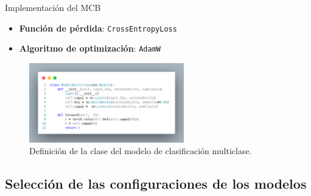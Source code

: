 \begin{frame}{Implementación del MCB}
	\begin{itemize}
		\item \textbf{Función de pérdida}: \texttt{CrossEntropyLoss}
		\item \textbf{Algoritmo de optimización}: \texttt{AdamW}
	\end{itemize}
	
	\begin{figure}[H]
	    \centering
	    \includegraphics[width=0.6\textwidth]{../Memoria/img/modelo/codigo/modeloMUL.png}
	    	\caption{Definición de la clase del modelo de clasificación multiclase.}
    		\label{fig:modBIN}
	\end{figure}
	
	\begin{table}[H]
		\centering 
		\caption{Valores de los hiperparámetros utilizados en los experimentos del modelo de clasificación multiclase.}
		\label{tab:hiperBIN}
	\end{table}
\end{frame}



\subsection{Selección de las configuraciones de los modelos}

